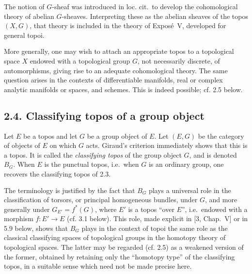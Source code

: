 \documentclass[11pt]{article}
\newcommand{\ie}{i.e.}
\newcommand{\loccit}{loc. cit.}
\begin{document}
The notion of \(G\)-sheaf was introduced in \loccit\ to develop the cohomological theory of abelian \(G\)-sheaves. Interpreting these as the abelian sheaves of the topos \((X,G)\), that theory is included in the theory of Expos\'e~V, developed for general topoi.

More generally, one may wish to attach an appropriate topos to a topological space \(X\) endowed with a topological group \(G\), not necessarily discrete, of automorphisms, giving rise to an adequate cohomological theory. The same question arises in the contexts of differentiable manifolds, real or complex analytic manifolds or spaces, and schemes. This is indeed possible; cf. 2.5 below.

\subsection*{2.4. Classifying topos of a group object}
Let \(E\) be a topos and let \(G\) be a group object of \(E\). Let \((E,G)\) be the category of objects of \(E\) on which \(G\) acts. Giraud's criterion immediately shows that this is a topos. It is called the \emph{classifying topos} of the group object \(G\), and is denoted \(B_G\). When \(E\) is the punctual topos, \ie\ when \(G\) is an ordinary group, one recovers the classifying topos of 2.3.

The terminology is justified by the fact that \(B_G\) plays a universal role in the classification of torsors, or principal homogeneous bundles, under \(G\), and more generally under \(G_{E'}=f^\ast(G)\), where \(E'\) is a topos ``over \(E\)'', \ie\ endowed with a morphism \(f:E'\to E\) (cf. 3.1 below). This role, made explicit in [3, Chap.~V] or in 5.9 below, shows that \(B_G\) plays in the context of topoi the same role as the classical classifying spaces of topological groups in the homotopy theory of topological spaces. The latter may be regarded (cf. 2.5) as a weakened version of the former, obtained by retaining only the ``homotopy type'' of the classifying topos, in a suitable sense which need not be made precise here.
\end{document}
